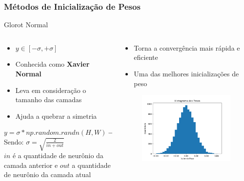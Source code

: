 \documentclass{beamer}
\begin{document}
\begin{frame}
	\frametitle{Métodos de Inicialização de Pesos}
	\begin{block}{Glorot Normal}
		\begin{columns}
			\begin{column}{0.6 \textwidth}
				\begin{itemize}
					\item $y \in [-\sigma, +\sigma]$
					\item Conhecida como \textbf{Xavier Normal}
					\item Leva em consideração o tamanho das camadas
					\item Ajuda a quebrar a simetria
				\end{itemize}
				$	y =  \sigma * np.random.randn(H, W) - \sigma$ \\
				Sendo:
				$\sigma = \sqrt{\frac{2}{in + out}}$ \\
				$in$ é a quantidade de neurônio da camada anterior e $out$ a quantidade de neurônio da camada atual
			\end{column}
			\begin{column}{0.4 \textwidth}
				\begin{itemize}
					\item Torna a convergência mais rápida e eficiente
					\item Uma das melhores inicializações de peso
				\end{itemize}
				\begin{figure}
					\centering
					\includegraphics[width=1\linewidth]{figures/pesos_glorot_normal.png}
				\end{figure}
			\end{column}
		\end{columns}
	\end{block}
\end{frame}
\end{document}

